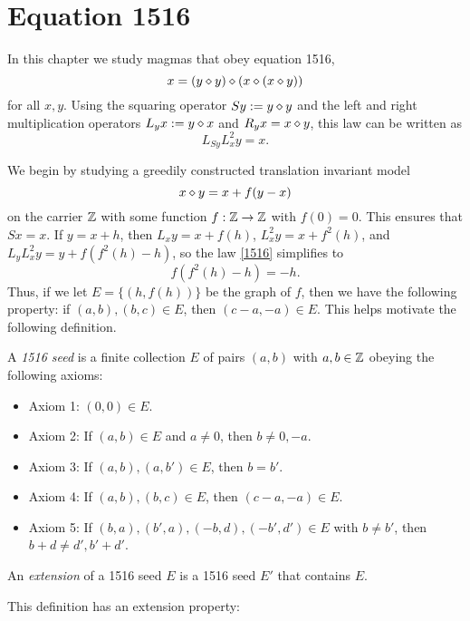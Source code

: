 \chapter{Equation 1516}\label{1516-chapter}

In this chapter we study magmas that obey equation 1516,
\begin{equation}\label{1516}
  x = (y \diamond y) \diamond (x \diamond (x \diamond y))
\end{equation}
for all $x,y$.  Using the squaring operator $Sy := y \diamond y$ and the left and right multiplication operators $L_y x := y \diamond x$ and $R_y x = x \diamond y$, this law can be written as
$$ L_{Sy} L_x^2 y = x.$$

We begin by studying a greedily constructed translation invariant model
\begin{equation}\label{xy-1516}
   x \diamond y = x+f(y-x)
\end{equation}
on the carrier $\mathbb{Z}$ with some function $f:\mathbb{Z} \to \mathbb{Z}$ with $f(0)=0$.  This ensures that $Sx = x$.  If $y = x+h$, then $L_x y = x + f(h)$, $L_x^2 y = x + f^2(h)$, and $L_y L_x^2 y = y + f(f^2(h)-h)$, so the law \eqref{1516} simplifies to
\begin{equation}\label{1516-f}
   f(f^2(h)-h) = -h.
\end{equation}
Thus, if we let $E = \{ (h, f(h))\}$ be the graph of $f$, then we have the following property: if $(a,b), (b,c) \in E$, then $(c-a,-a) \in E$.  This helps motivate the following definition.

\begin{definition}[1516 seed]\label{1516-seed}  A \emph{1516 seed} is a finite collection $E$ of pairs $(a,b)$ with $a,b \in \mathbb{Z}$ obeying the following axioms:
  \begin{itemize}
  \item Axiom 1: $(0,0) \in E$.
  \item Axiom 2: If $(a,b) \in E$ and $a \neq 0$, then $b \neq 0, -a$.
  \item Axiom 3: If $(a,b), (a,b') \in E$, then $b=b'$.
  \item Axiom 4: If $(a,b), (b,c) \in E$, then $(c-a,-a) \in E$.
  \item Axiom 5: If $(b,a), (b',a), (-b, d), (-b',d') \in E$ with $b \neq b'$, then $b+d \neq d', b'+d'$.
  \end{itemize}
An \emph{extension} of a 1516 seed $E$ is a 1516 seed $E'$ that contains $E$.
\end{definition}

This definition has an extension property:

